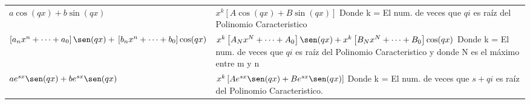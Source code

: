 \documentclass[12pt]{report}                                %
\begin{document}
\begin{longtable}{p{70mm} || p{90mm}}

            $a \cos(qx) + b \sin(qx)$                                                               &

            $x^k \left[ A \cos(qx) + B \sin(qx) \right]$                                            \newline
            \tiny                                                                                   \newline
            \footnotesize Donde k = El num. de veces que $qi$ es raíz del Polinomio Caracteristico  \\ [6.0ex]
 

            $\left[a_nx^n+\cdots+a_0\right] \sen(qx) +                                              \newline
            \left[b_nx^n+\cdots+b_0\right]  \cos(qx) $                                              &

            $x^k \left[A_Nx^N+\cdots+A_0\right]\sen(qx) +                                           \newline
             x^k \left[B_Nx^N+\cdots+B_0\right]\cos(qx) $                                           \newline
            \tiny                                                                                   \newline
            \footnotesize Donde k = El num. de veces que $qi$ es raíz del
            Polinomio Caracteristico y donde N es el máximo entre m y n                             \\ [6.0ex]
         

            $a e^{sx} \sen(qx) + b e^{sx} \sen(qx)$                                                 &

            $x^k \left[A e^{sx} \sen(qx) + B e^{sx} \sen(qx) \right]$                               \newline
            \tiny                                                                                   \newline
            \footnotesize Donde k = El num. de veces que $s+qi$ es raíz del
            Polinomio Caracteristico.                                                               \\ [6.0ex]


\end{longtable}
\end{document}
